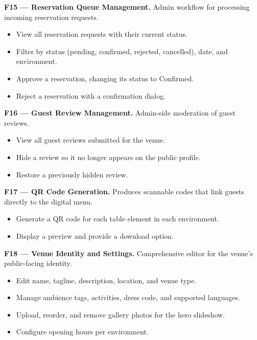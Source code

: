 \documentclass[12pt,a4paper]{article}
\begin{document}
\textbf{F15 --- Reservation Queue Management.}
Admin workflow for processing incoming reservation requests.
\begin{itemize}[leftmargin=1.5em, topsep=2pt, itemsep=1pt]
    \item View all reservation requests with their current status.
    \item Filter by status (pending, confirmed, rejected, cancelled), date,
          and environment.
    \item Approve a reservation, changing its status to Confirmed.
    \item Reject a reservation with a confirmation dialog.
\end{itemize}

\textbf{F16 --- Guest Review Management.}
Admin-side moderation of guest reviews.
\begin{itemize}[leftmargin=1.5em, topsep=2pt, itemsep=1pt]
    \item View all guest reviews submitted for the venue.
    \item Hide a review so it no longer appears on the public profile.
    \item Restore a previously hidden review.
\end{itemize}

\textbf{F17 --- QR Code Generation.}
Produces scannable codes that link guests directly to the digital menu.
\begin{itemize}[leftmargin=1.5em, topsep=2pt, itemsep=1pt]
    \item Generate a QR code for each table element in each environment.
    \item Display a preview and provide a download option.
\end{itemize}

\textbf{F18 --- Venue Identity and Settings.}
Comprehensive editor for the venue's public-facing identity.
\begin{itemize}[leftmargin=1.5em, topsep=2pt, itemsep=1pt]
    \item Edit name, tagline, description, location, and venue type.
    \item Manage ambience tags, activities, dress code, and supported languages.
    \item Upload, reorder, and remove gallery photos for the hero slideshow.
    \item Configure opening hours per environment.
\end{itemize}
\end{document}
